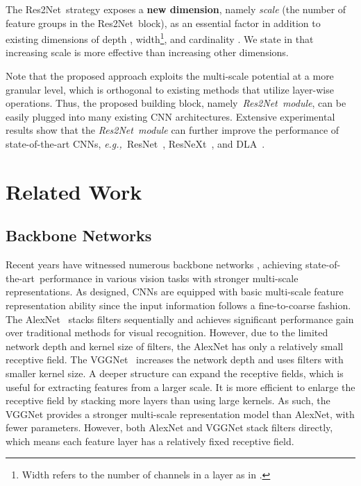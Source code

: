 \documentclass[10pt,journal,cspaper,compsoc]{IEEEtran}
\newcommand{\ourM}{{Res2Net}}
\newcommand{\sArt}{{state-of-the-art~}}
\def\eg{\emph{e.g.,~}}
\begin{document}
The \ourM~strategy exposes a \textbf{new dimension}, namely
\emph{scale} (the number of feature groups in the \ourM~block),
as an essential factor in addition to existing dimensions of
depth \cite{simonyan2014very}, width\footnote{
Width refers to the number of channels in a layer as in
\cite{Zagoruyko2016WRN}.},
and cardinality \cite{xie2017aggregated}.
We state in  that increasing
scale is more effective than increasing other dimensions.


Note that the proposed approach exploits the multi-scale
potential at a more granular level,
which is orthogonal to existing methods that utilize layer-wise operations.
Thus, the proposed building block, namely~\emph{\ourM~module},
can be easily plugged into many existing CNN architectures.
Extensive experimental results show that the \emph{\ourM~module} can further improve
the performance of state-of-the-art CNNs,
\eg ResNet~\cite{he2016deep}, ResNeXt~\cite{xie2017aggregated},
and DLA~\cite{yu2018deep}.



\section{Related Work}

\subsection{Backbone Networks}

Recent years have witnessed numerous backbone networks
\cite{krizhevsky2012imagenet,simonyan2014very,szegedy2015going,he2016deep,
huang2017densely,Chollet_2017_CVPR,xie2017aggregated,yu2018deep},
achieving \sArt performance in various vision tasks
with stronger multi-scale representations.
As designed, CNNs are equipped with basic multi-scale 
feature representation ability
since the input information follows a fine-to-coarse fashion.
The AlexNet~\cite{krizhevsky2012imagenet} stacks filters
sequentially and achieves significant performance gain
over traditional methods for visual recognition.
However, due to the limited network depth and kernel size of filters,
the AlexNet has only a relatively small receptive field.
The VGGNet~\cite{simonyan2014very} increases the network depth and uses filters
with smaller kernel size.
A deeper structure can expand the receptive fields,
which is useful for extracting features from a larger scale.
It is more efficient to enlarge the receptive field
by stacking more layers than using large kernels.
As such, the VGGNet provides a stronger multi-scale representation model
than AlexNet,
with fewer parameters.
However, both AlexNet and VGGNet stack filters directly, 
which means each feature layer has a relatively fixed receptive field.
\end{document}
